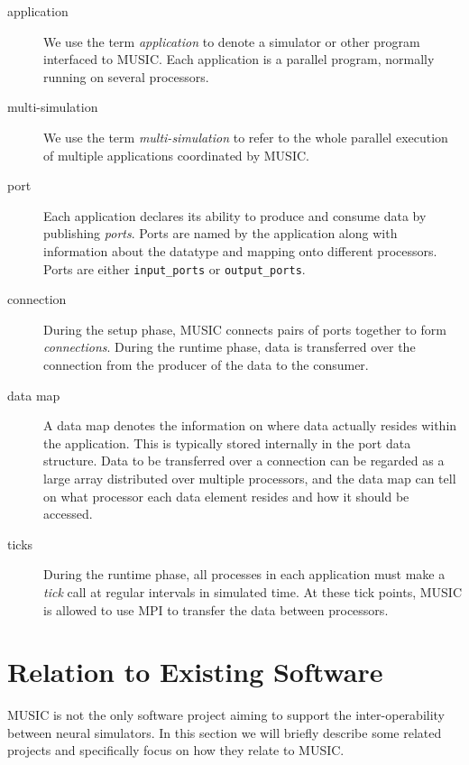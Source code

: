 \documentclass[a4paper]{report}
\begin{document}
\begin{description}
\item[application] We use the term
  \emph{application} to denote a simulator or other
  program interfaced to MUSIC.  Each application is a parallel
  program, normally running on several processors.

\item[multi-simulation] We use the term
  \emph{multi-simulation} to refer to the
  whole parallel execution of multiple applications coordinated by
  MUSIC.

\item[port] Each application declares its ability to produce and
  consume data by publishing \emph{ports}.  Ports are
  named by the application along with information about the datatype
  and mapping onto different processors.  Ports are either
  \lstinline|input_ports| or
  \lstinline|output_ports|.

\item[connection] During the setup phase, MUSIC connects pairs of
  ports together to form \emph{connections}.  During
  the runtime phase, data is transferred over the connection from the
  producer of the data to the consumer.

\item[data map] A data map denotes the information on
  where data actually resides within the application.  This is
  typically stored internally in the port data structure.  Data to be
  transferred over a connection can be regarded as a large array
  distributed over multiple processors, and the data map can tell on
  what processor each data element resides and how it should be
  accessed.

\item[ticks] During the runtime phase, all processes in each
  application must make a \emph{tick} call at regular
  intervals in simulated time.  At these tick points, MUSIC is allowed
  to use MPI to transfer the data between processors.
\end{description}


\section{Relation to Existing Software}

MUSIC is not the only software project aiming to support the
inter-operability between neural simulators.  In this section we will
briefly describe some related projects and specifically focus on how
they relate to MUSIC.
\end{document}
